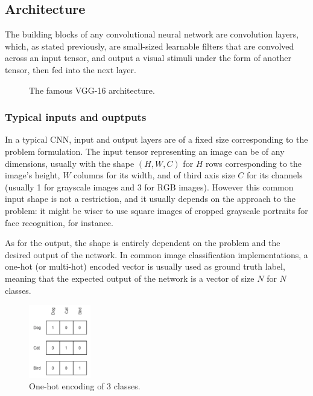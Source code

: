 \subsection{Architecture}

The building blocks of any convolutional neural network are convolution layers,
which, as stated previously, are small-sized learnable filters that are
convolved across an input tensor, and output a visual stimuli under the form of
another tensor, then fed into the next layer.

\begin{figure}[h]
	\center
	\resizebox{480pt}{!}{
		
	}
	\caption{The famous VGG-16 architecture.}
	\label{fig:vgg16}
\end{figure}

	\subsubsection{Typical inputs and ouptputs}
In a typical CNN, input and output layers are of a fixed size corresponding to
the problem formulation. The input tensor representing an image can be of any
dimensions, usually with the shape $(H,W,C)$ for $H$ rows corresponding to the
image's height, $W$ columns for its width, and of third axis size $C$ for its
channels (usually 1 for grayscale images and 3 for RGB images). However this
common input shape is not a restriction, and it usually depends on the approach
to the problem: it might be wiser to use square images of cropped grayscale
portraits for face recognition, for instance.\\


As for the output, the shape is entirely dependent on the problem and the
desired output of the network. In common image classification implementations,
a one-hot (or multi-hot) encoded vector is usually used as ground truth label,
meaning that the expected output of the network is a vector of size $N$ for $N$
classes.

\begin{figure}
	\begin{center}
		\includegraphics[width=0.24\textwidth]{figure/one_hot.png}
	\end{center}
	\label{fig:onehot}
	\caption{One-hot encoding of 3 classes.}
\end{figure}


